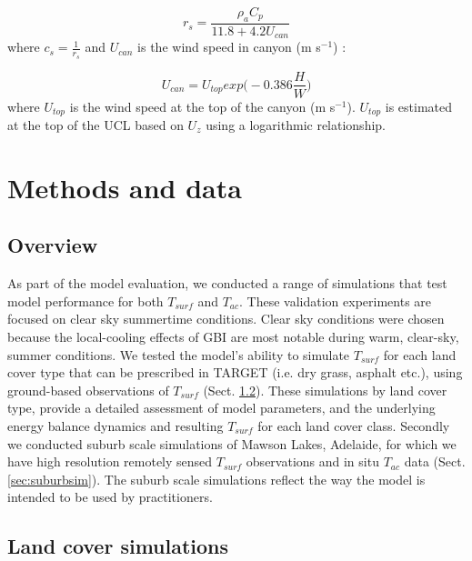 \documentclass[gmd, manuscript]{copernicus}
\begin{document}
\begin{equation} 
\ensuremath{r_{s}} = 
\frac{\ensuremath{\rho_{a}}\ensuremath{C_{p}}}{11.8+4.2U_{can}}
\label{eq:rs} 
\end{equation} 
where $\ensuremath{c_{s}} = \frac{1}{\ensuremath{r_{s}}}$ and $U_{can}$ is the wind speed in canyon (m s$^{-1}$) \citep{Kusaka2001}: 

\begin{equation} 
U_{can} = \ensuremath{U_{top}} exp{ \Bigg( -0.386 \frac{H}{W} \Bigg)}
\label{eq:ucan} \end{equation} where \ensuremath{U_{top}} is the wind speed at the top of the canyon (m s$^{-1}$). \ensuremath{U_{top}} is estimated at the top of the UCL based on \ensuremath{U_{z}} using a logarithmic relationship.



\section{Methods and data}\label{sec:validation}
\subsection{Overview}\label{sec:validationover}


As part of the model evaluation, we conducted a range of simulations that test model performance for both $T_{surf}$ and $T_{ac}$. These validation experiments are focused on clear sky summertime conditions. Clear sky conditions were chosen because the local-cooling effects of GBI are most notable during warm, clear-sky, summer conditions. We tested the model's ability to simulate $T_{surf}$ for each land cover type that can be prescribed in TARGET (i.e. dry grass, asphalt etc.), using ground-based observations of $T_{surf}$ (Sect. \ref{sec:landcoversim}). These simulations by land cover type, provide a detailed assessment of model parameters, and the underlying energy balance dynamics and resulting $T_{surf}$ for each land cover class. Secondly we conducted suburb scale simulations of Mawson Lakes, Adelaide, for which we have high resolution remotely sensed $T_{surf}$ observations and in situ $T_{ac}$ data (Sect. \ref{sec:suburbsim}).  The suburb scale simulations reflect the way the model is intended to be used by practitioners.



\subsection{Land cover simulations}\label{sec:landcoversim} 
\end{document}
